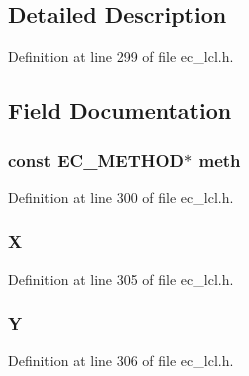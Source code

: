 \subsection{Detailed Description}


Definition at line 299 of file ec\+\_\+lcl.\+h.



\subsection{Field Documentation}
\subsubsection[{\texorpdfstring{meth}{meth}}]{\setlength{\rightskip}{0pt plus 5cm}const {\bf E\+C\+\_\+\+M\+E\+T\+H\+OD}$\ast$ meth}\hypertarget{structec__point__st_a2fc1498c0eb6bf4c024e00e73b172708}{}\label{structec__point__st_a2fc1498c0eb6bf4c024e00e73b172708}


Definition at line 300 of file ec\+\_\+lcl.\+h.

\subsubsection[{\texorpdfstring{X}{X}}]{ X}\hypertarget{structec__point__st_a8522adb36f2b972395a10c6917d18bc8}{}\label{structec__point__st_a8522adb36f2b972395a10c6917d18bc8}


Definition at line 305 of file ec\+\_\+lcl.\+h.

\subsubsection[{\texorpdfstring{Y}{Y}}]{ Y}\hypertarget{structec__point__st_ab3bb3b45b5308a35e5f209e4210d9797}{}\label{structec__point__st_ab3bb3b45b5308a35e5f209e4210d9797}


Definition at line 306 of file ec\+\_\+lcl.\+h.

